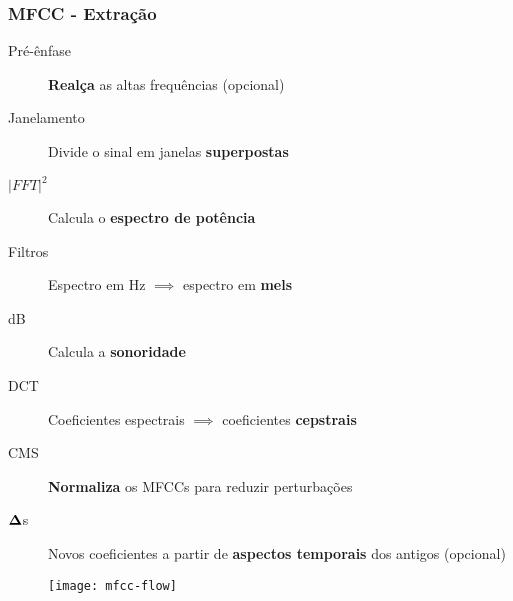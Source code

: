 \begin{frame}
\frametitle{MFCC - Extração}
\begin{description}
    \item[Pré-ênfase] \textbf{Realça} as altas frequências (opcional)
    \pause
    \item[Janelamento] Divide o sinal em janelas \textbf{superpostas}
    \pause
    \item[$|FFT|^2$] Calcula o \textbf{espectro de potência}
    \pause
    \item[Filtros] Espectro em Hz $\implies$ espectro em \textbf{mels}
    \pause
    \item[dB] Calcula a \textbf{sonoridade}
    \pause
    \item[DCT] Coeficientes espectrais $\implies$ coeficientes \textbf{cepstrais}
    \pause
    \item[CMS] \textbf{Normaliza} os MFCCs para reduzir perturbações
    \pause
    \item[$\boldsymbol{\Delta}$s] Novos coeficientes a partir de \textbf{aspectos temporais} dos antigos (opcional)
    \pause
\end{description}

\begin{figure}[ht]
    \centering
    \texttt{[image: mfcc-flow]}
\end{figure}
\end{frame}
